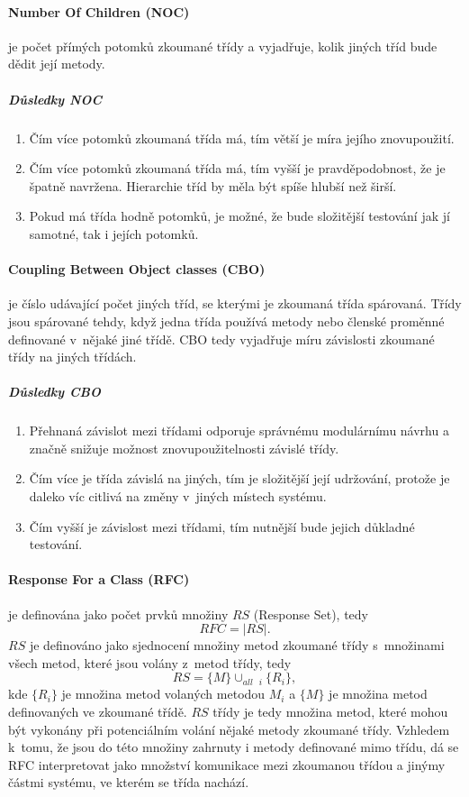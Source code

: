 \documentclass[11pt,twoside,a4paper]{book}
\begin{document}
\paragraph{Number Of Children (NOC)} je počet přímých potomků zkoumané třídy a vyjadřuje,
kolik jiných tříd bude dědit její metody.

\subparagraph{Důsledky NOC}
\begin{enumerate}
\item Čím více potomků zkoumaná třída má, tím větší je míra jejího znovupoužití.
\item Čím více potomků zkoumaná třída má, tím vyšší je pravděpodobnost, že je špatně navržena. Hierarchie tříd by měla být spíše hlubší než širší.
\item Pokud má třída hodně potomků, je možné, že bude složitější testování jak jí samotné, tak i jejích potomků.
\end{enumerate}

\paragraph{Coupling Between Object classes (CBO)} je číslo udávající počet jiných tříd, se kterými je zkoumaná třída spárovaná.
Třídy jsou spárované tehdy, když jedna třída používá metody nebo členské proměnné definované v~nějaké jiné třídě.
CBO tedy vyjadřuje míru závislosti zkoumané třídy na jiných třídách.

\subparagraph{Důsledky CBO}
\begin{enumerate}
\item Přehnaná závislot mezi třídami odporuje správnému modulárnímu návrhu a značně snižuje možnost znovupoužitelnosti závislé třídy.
\item Čím více je třída závislá na jiných, tím je složitější její udržování, protože je daleko víc citlivá na změny v~jiných místech systému.
\item Čím vyšší je závislost mezi třídami, tím nutnější bude jejich důkladné testování.
\end{enumerate}

\paragraph{Response For a Class (RFC)} je definována jako počet prvků množiny $RS$ (Response Set),
tedy
$$RFC = |RS|.$$
$RS$ je definováno jako sjednocení množiny metod zkoumané třídy s~množinami
všech metod, které jsou volány z~metod třídy, tedy
$$RS = \{M\} \cup_{all}\ _i\ \{R_i\},$$
kde $\{R_i\}$
je množina metod volaných metodou $M_i$ a $\{M\}$ je množina metod definovaných ve zkoumané třídě.
$RS$ třídy je tedy množina metod, které mohou být vykonány při potenciálním volání nějaké metody
zkoumané třídy. Vzhledem k~tomu, že jsou do této množiny zahrnuty i metody definované mimo třídu,
dá se RFC interpretovat jako množství komunikace mezi zkoumanou třídou a jinýmy částmi systému,
ve kterém se třída nachází.
\end{document}

